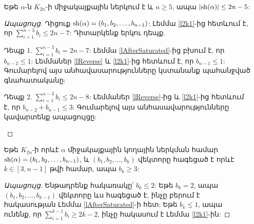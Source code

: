 \begin{corollary}
\label{c2n5}
Եթե $\alpha$-ն $K_{2n}$-ի միջակայքային ներկում է և $n\geq 5$, ապա  
$|{\rm sh}(\alpha)| \leq 2n-5$:
\end{corollary}

\begin{proof}[Ապացույց]
Դիցուք ${\rm sh}(\alpha) = (b_1,b_2,\ldots, b_{n-1})$: Լեմմա \ref{l2k1}-ից հետևում է, որ $\sum\limits_{i=1}^{n-3}{b_i} \leq 2n-7$: Դիտարկենք երկու դեպք.
\begin{description}
\item{Դեպք 1.} $\sum\limits_{i=1}^{n-3}{b_i} = 2n-7$: Լեմմա \ref{lAfterSaturated}-ից բխում է, որ $b_{n-2} \leq 1$: Լեմմաներ \ref{lReverse} և \ref{l2k1}-ից հետևում է, որ $b_{n-1} \leq 1$: Գումարելով այս անհավասարությունները կստանանք պահանջված գնահատականը:
\item{Դեպք 2.} $\sum\limits_{i=1}^{n-3}{b_i} \leq 2n-8$: Լեմմաներ \ref{lReverse}-ից և \ref{l2k1}-ից հետևում է, որ $b_{n-2} + b_{n-1} \leq 3$: Գումարելով այս անհասավարությունները կավարտենք ապացույցը:
\end{description}
\end{proof}


\begin{lemma}
\label{lBeforeSaturated}
Եթե $K_{2n}$-ի որևէ $\alpha$ միջակայքային կողային ներկման համար ${\rm sh}(\alpha) = (b_1,b_2,\ldots, b_{n-1})$, և $(b_1,b_2,\ldots,b_k)$ վեկտորը հագեցած է որևէ $k \in [3,n-1]$ թվի համար, ապա $b_{k} \geq 3$:
\end{lemma}

\begin{proof}[Ապացույց]
Ենթադրենք հակառակը՝ $b_k \leq 2$: Եթե $b_k=2$, ապա $(b_1,b_2,\ldots,b_{k-1})$ վեկտորը ևս հագեցած է, ինչը բերում է հակասության Լեմմա \ref{lAfterSaturated}-ի հետ: Եթե $b_k \leq 1$, ապա ունենք, որ $\sum\limits_{i=1}^{k-1}{b_i} \geq 2k-2$, ինչը հակասում է Լեմմա \ref{l2k1}-ին:
\end{proof}



